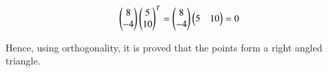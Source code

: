 \documentclass[journal,12pt,twocolumn]{IEEEtran}
\begin{document}
\begin{align}
    \begin{pmatrix}
8\\
-4 
\end{pmatrix}\begin{pmatrix} 5\\
10
\end{pmatrix}^T =  \begin{pmatrix}
8\\
-4 
\end{pmatrix} \begin{pmatrix}
5 & 10
\end{pmatrix}=0
\end{align}

Hence, using orthogonality, it is proved that the points form a right angled triangle. 














\end{document}
